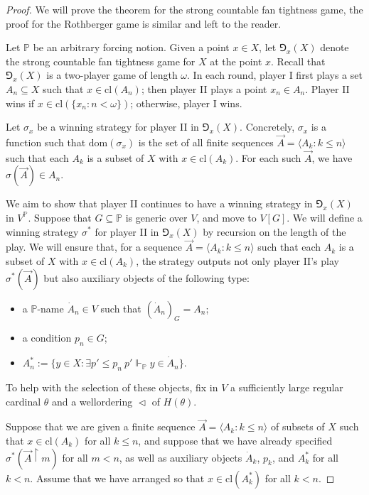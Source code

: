 \documentclass[10pt,a4paper]{amsart}
\renewcommand{\P}{\bb{P}}
\newcommand{\bb}{\mathbb}
\newcommand{\dom}{\mathrm{dom}}
\begin{document}
\begin{proof}
We will prove the theorem for the strong countable fan tightness game, the proof for the Rothberger game is similar and left to the reader.

  Let $\P$ be an arbitrary forcing notion. Given a point $x \in X$, let $\Game_x(X)$ denote the 
  strong countable fan tightness game for $X$ at the point $x$. Recall that $\Game_x(X)$ is a two-player game of length $\omega$. In each round, player I first plays a set $A_n \subseteq X$ such that $x \in \mathrm{cl}(A_n)$; then player II plays a point $x_n \in A_n$. Player II wins if $x \in \mathrm{cl}(\{x_n :n <\omega\})$; otherwise, player I wins.
  
  Let $\sigma_x$ be a winning strategy for player II in $\Game_x(X)$. Concretely, 
  $\sigma_x$ is a function such that $\dom(\sigma_x)$ is the set of all finite sequences 
  $\vec{A} = \langle A_k :k \leq n \rangle$ such that each $A_k$ is a subset of $X$ with 
  $x \in \mathrm{cl}(A_k)$. For each such $\vec{A}$, we have $\sigma(\vec{A}) \in A_n$.
  
  We aim to show that player II continues to have a winning strategy in $\Game_x(X)$ in 
  $V^{\P}$. Suppose that $G \subseteq \P$ is generic over $V$, and move to $V[G]$. We will 
  define a winning strategy $\sigma^*$ for player II in $\Game_x(X)$ by recursion on the 
  length of the play. We will ensure that, for a sequence $\vec{A} = \langle A_k :
  k \leq n \rangle$ such that each $A_k$ is a subset of $X$ with $x \in \mathrm{cl}(A_k)$, 
  the strategy outputs not only player II's play $\sigma^*(\vec{A})$ but also auxiliary 
  objects of the following type:
  \begin{itemize}
    \item a $\P$-name $\dot{A}_n \in V$ such that $(\dot{A}_n)_G = A_n$;
    \item a condition $p_n \in G$;
    \item $A^*_n := \{y \in X :\exists p' \leq p_n \ p' \Vdash_{\P} y \in \dot{A}_n\}$.
  \end{itemize}
  To help with the selection of these objects, fix in $V$ a sufficiently large regular cardinal 
  $\theta$ and a wellordering $\vartriangleleft$ of $H(\theta)$.
  
  Suppose that we are given a finite sequence $\vec{A} = \langle A_k :k \leq n \rangle$ 
  of subsets of $X$ such that $x \in \mathrm{cl}(A_k)$ for all $k \leq n$, and suppose that 
  we have already specified $\sigma^*(\vec{A} \restriction m)$ for all $m < n$, as well 
  as auxiliary objects $\dot{A}_k$, $p_k$, and $A^*_k$ for all $k < n$. Assume that we have 
  arranged so that $x \in \mathrm{cl}(A^*_k)$ for all $k < n$.
  

\end{proof}
\end{document}
